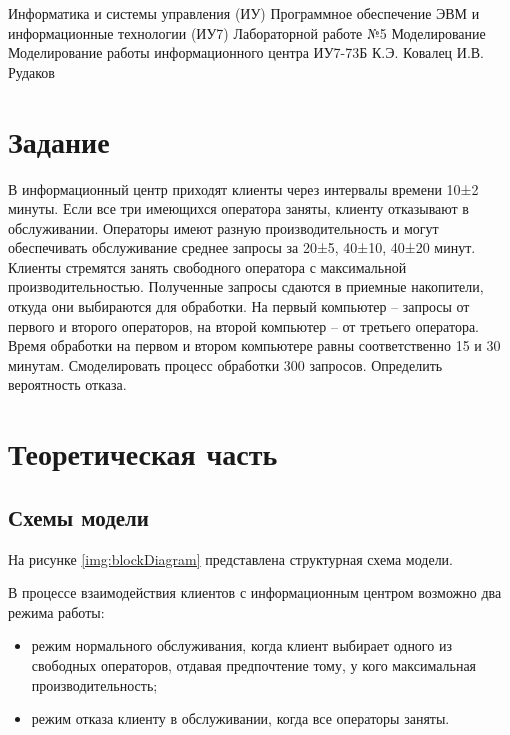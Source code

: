 \documentclass{bmstu}
\begin{document}
\makereporttitle
{Информатика и системы управления (ИУ)}
{Программное обеспечение ЭВМ и информационные технологии (ИУ7)}
{Лабораторной работе №5}
{Моделирование}
{Моделирование работы информационного центра}
{}
{ИУ7-73Б}
{К.Э. Ковалец}
{И.В. Рудаков}


\setcounter{page}{2}
\renewcommand{\contentsname}{Содержание} 
\tableofcontents

\chapter{Задание}

В информационный центр приходят клиенты через интервалы времени 10±2 минуты. Если все три имеющихся оператора заняты, клиенту отказывают в обслуживании. Операторы имеют разную производительность и могут обеспечивать обслуживание среднее запросы за 20±5, 40±10, 40±20 минут. Клиенты стремятся занять свободного оператора с максимальной производительностью. Полученные запросы сдаются в приемные накопители, откуда они выбираются для обработки. На первый компьютер -- запросы от первого и второго операторов, на второй компьютер -- от третьего оператора. Время обработки на первом и втором компьютере равны соответственно 15 и 30 минутам. Смоделировать процесс обработки 300 запросов. Определить вероятность отказа.

\chapter{Теоретическая часть}

\section{Схемы модели}

На рисунке \ref{img:blockDiagram} представлена структурная схема модели.


В процессе взаимодействия клиентов с информационным центром возможно два режима работы:

\begin{itemize}
    \item режим нормального обслуживания, когда клиент выбирает одного из свободных операторов, отдавая предпочтение тому, у кого максимальная производительность;
    \item режим отказа клиенту в обслуживании, когда все операторы заняты.
\end{itemize}
\end{document}
